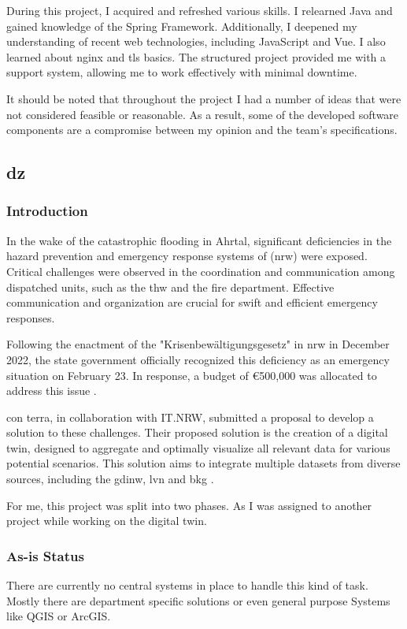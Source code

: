 \documentclass[11pt, titlepage, a4paper]{article}
\begin{document}
During this project, I acquired and refreshed various skills. I relearned Java and gained knowledge of the Spring Framework. Additionally, I deepened my understanding of recent web technologies, including JavaScript and  Vue. I also learned about \Gls{nginx} and \gls{tls} basics.
The structured project provided me with a support system, allowing me to work effectively with minimal downtime.

It should be noted that throughout the project I had a number of ideas that were not considered feasible or reasonable. As a result, some of the developed software components are a compromise between my opinion and the team's specifications.
\subsection{\gls{dz}}
\subsubsection{Introduction}
In the wake of the catastrophic flooding in Ahrtal, significant deficiencies in the hazard prevention and emergency response systems of (\gls {nrw}) were exposed. Critical challenges were observed in the coordination and communication among dispatched units, such as the  \gls{thw} and the fire department. \cite{anna-laraweidingerAhrtalHochwasser2024} Effective communication and organization are crucial for swift and efficient emergency responses.

Following the enactment of the "Krisenbewältigungsgesetz" in \gls {nrw} in December 2022, the state government officially recognized this deficiency as an emergency situation on February 23. In response, a budget of €500,000 was allocated to address this issue \cite{landesregierungnordrhein-westfalenGesetzZurErrichtung2022}.

con terra, in collaboration with IT.NRW, submitted a proposal to develop a solution to these challenges. Their proposed solution is the creation of a digital twin, designed to aggregate and optimally visualize all relevant data for various potential scenarios. This solution aims to integrate multiple datasets from diverse sources, including the \gls{gdinw}, \gls{lvn} and \gls{bkg} \cite{caffier14GDIForumNordrheinWestfalen}.

For me, this project was split into two phases. As I was assigned to another project while working on the digital twin.

\subsubsection{As-is Status}
There are currently no central systems in place to handle this kind of task. Mostly there are department specific solutions or even general purpose Systems like QGIS or ArcGIS.
\end{document}
